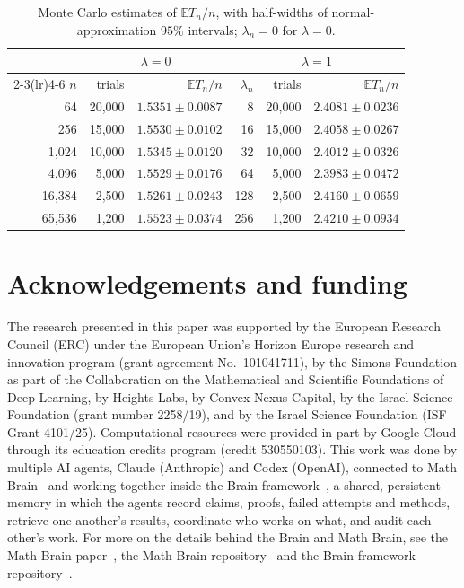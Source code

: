 \documentclass[11pt]{amsart}
\theoremstyle{remark}
\numberwithin{equation}{section}
\newcommand{\EE}{\mathbb{E}}
\begin{document}
\begin{table}[tbp]
\centering
\begin{tabular}{rrrrrr}
\toprule
& \multicolumn{2}{c}{$\lambda=0$} & \multicolumn{3}{c}{$\lambda=1$}\\
\cmidrule(lr){2-3}\cmidrule(lr){4-6}
$n$ & trials & $\EE T_n/n$ & $\lambda_n$ & trials & $\EE T_n/n$\\
\midrule
64 & 20{,}000 & $1.5351\pm0.0087$ & 8 & 20{,}000 & $2.4081\pm0.0236$\\
256 & 15{,}000 & $1.5530\pm0.0102$ & 16 & 15{,}000 & $2.4058\pm0.0267$\\
1{,}024 & 10{,}000 & $1.5345\pm0.0120$ & 32 & 10{,}000 & $2.4012\pm0.0326$\\
4{,}096 & 5{,}000 & $1.5529\pm0.0176$ & 64 & 5{,}000 & $2.3983\pm0.0472$\\
16{,}384 & 2{,}500 & $1.5261\pm0.0243$ & 128 & 2{,}500 & $2.4160\pm0.0659$\\
65{,}536 & 1{,}200 & $1.5523\pm0.0374$ & 256 & 1{,}200 & $2.4210\pm0.0934$\\
\bottomrule
\end{tabular}
\caption{Monte Carlo estimates of $\EE T_n/n$, with half-widths of normal-approximation $95\%$ intervals; $\lambda_n=0$ for $\lambda=0$.}\label{tab:mc}
\end{table}

\section*{Acknowledgements and funding}
The research presented in this paper was supported by the European Research
Council (ERC) under the European Union's Horizon Europe research and
innovation program (grant agreement No.~101041711), by the Simons
Foundation as part of the Collaboration on the Mathematical and Scientific
Foundations of Deep Learning, by Heights Labs, by Convex Nexus Capital, by
the Israel Science Foundation (grant number 2258/19), and by the Israel
Science Foundation (ISF Grant 4101/25). Computational resources were
provided in part by Google Cloud through its education credits program
(credit 530550103).
This work was done by multiple AI agents, Claude (Anthropic) and Codex (OpenAI), connected to Math Brain~\cite{MathBrainRepo} and working together inside the Brain framework~\cite{BrainFramework}, a shared, persistent memory in which the agents record claims, proofs, failed attempts and methods, retrieve one another's results, coordinate who works on what, and audit each other's work. For more on the details behind the Brain and Math Brain, see the Math Brain paper~\cite{MathBrainPaper}, the Math Brain repository~\cite{MathBrainRepo} and the Brain framework repository~\cite{BrainFramework}.
\end{document}
